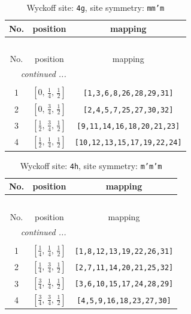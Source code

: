\documentclass[fleqn,8pt]{jsarticle}
\begin{document}
\renewcommand{\arraystretch}{1.2}
\begin{longtable}{ccc}
\caption{Wyckoff site: {\tt 4g}, site symmetry: {\tt mm'm}}
 \\
 \hline \hline
No. & position & mapping \\ \hline \endfirsthead

\multicolumn{2}{l}{\tablename\ \thetable{}} \\
 \hline \hline
No. & position & mapping \\ \hline \endhead

 \hline \hline
\multicolumn{2}{r}{\footnotesize\it continued ...} \\ \endfoot

 \hline \hline
\multicolumn{2}{r}{} \\ \endlastfoot

1 & $\left[ 0,\, \frac{1}{4},\, \frac{1}{2} \right]$ & {\tt [1,3,6,8,26,28,29,31]} \\ \hline
2 & $\left[ 0,\, \frac{3}{4},\, \frac{1}{2} \right]$ & {\tt [2,4,5,7,25,27,30,32]} \\ \hline
3 & $\left[ \frac{1}{2},\, \frac{3}{4},\, \frac{1}{2} \right]$ & {\tt [9,11,14,16,18,20,21,23]} \\ \hline
4 & $\left[ \frac{1}{2},\, \frac{1}{4},\, \frac{1}{2} \right]$ & {\tt [10,12,13,15,17,19,22,24]} \\
\end{longtable}
\renewcommand{\arraystretch}{1.2}
\begin{longtable}{ccc}
\caption{Wyckoff site: {\tt 4h}, site symmetry: {\tt m'm'm}}
 \\
 \hline \hline
No. & position & mapping \\ \hline \endfirsthead

\multicolumn{2}{l}{\tablename\ \thetable{}} \\
 \hline \hline
No. & position & mapping \\ \hline \endhead

 \hline \hline
\multicolumn{2}{r}{\footnotesize\it continued ...} \\ \endfoot

 \hline \hline
\multicolumn{2}{r}{} \\ \endlastfoot

1 & $\left[ \frac{1}{4},\, \frac{1}{4},\, \frac{1}{2} \right]$ & {\tt [1,8,12,13,19,22,26,31]} \\ \hline
2 & $\left[ \frac{1}{4},\, \frac{3}{4},\, \frac{1}{2} \right]$ & {\tt [2,7,11,14,20,21,25,32]} \\ \hline
3 & $\left[ \frac{3}{4},\, \frac{1}{4},\, \frac{1}{2} \right]$ & {\tt [3,6,10,15,17,24,28,29]} \\ \hline
4 & $\left[ \frac{3}{4},\, \frac{3}{4},\, \frac{1}{2} \right]$ & {\tt [4,5,9,16,18,23,27,30]} \\
\end{longtable}
\end{document}
